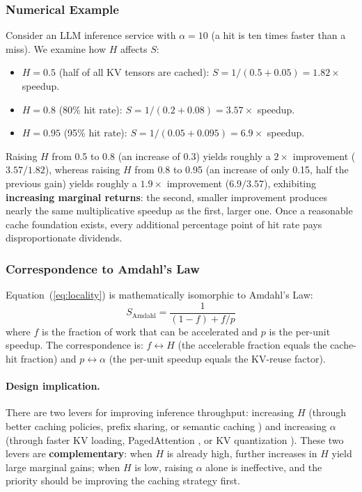 \subsubsection{Numerical Example}

Consider an LLM inference service with $\alpha = 10$ (a hit is ten times faster than a miss). We examine how $H$ affects $S$:

\begin{itemize}[nosep]
\item $H = 0.5$ (half of all KV tensors are cached): $S = 1/(0.5 + 0.05) = 1.82\times$ speedup.
\item $H = 0.8$ (80\% hit rate): $S = 1/(0.2 + 0.08) = 3.57\times$ speedup.
\item $H = 0.95$ (95\% hit rate): $S = 1/(0.05 + 0.095) = 6.9\times$ speedup.
\end{itemize}

Raising $H$ from 0.5 to 0.8 (an increase of 0.3) yields roughly a $2\times$ improvement ($3.57/1.82$), whereas raising $H$ from 0.8 to 0.95 (an increase of only 0.15, half the previous gain) yields roughly a $1.9\times$ improvement ($6.9/3.57$), exhibiting \textbf{increasing marginal returns}: the second, smaller improvement produces nearly the same multiplicative speedup as the first, larger one. Once a reasonable cache foundation exists, every additional percentage point of hit rate pays disproportionate dividends.

\subsubsection{Correspondence to Amdahl's Law}

Equation~(\ref{eq:locality}) is mathematically isomorphic to Amdahl's Law:
\begin{equation}
S_{\mathrm{Amdahl}} = \frac{1}{(1-f) + f/p}
\end{equation}
where $f$ is the fraction of work that can be accelerated and $p$ is the per-unit speedup. The correspondence is: $f \leftrightarrow H$ (the accelerable fraction equals the cache-hit fraction) and $p \leftrightarrow \alpha$ (the per-unit speedup equals the KV-reuse factor).

\paragraph{Design implication.}
There are two levers for improving inference throughput: increasing $H$ (through better caching policies, prefix sharing, or semantic caching \cite{gim2024promptcache}) and increasing $\alpha$ (through faster KV loading, PagedAttention \cite{kwon2023pagedattention}, or KV quantization \cite{hooper2024kvquant}). These two levers are \textbf{complementary}: when $H$ is already high, further increases in $H$ yield large marginal gains; when $H$ is low, raising $\alpha$ alone is ineffective, and the priority should be improving the caching strategy first.

